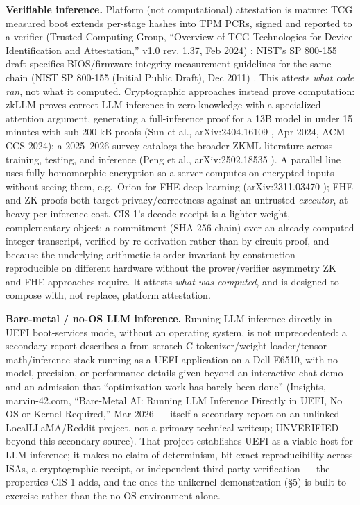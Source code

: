 \documentclass[11pt]{article}
\begin{document}
\textbf{Verifiable inference.} Platform (not computational) attestation is
mature: TCG measured boot extends per-stage hashes into TPM PCRs, signed
and reported to a verifier (Trusted Computing Group, ``Overview of TCG
Technologies for Device Identification and Attestation,'' v1.0 rev. 1.37,
Feb 2024) \citep{tcg2024overview}; NIST's SP 800-155 draft specifies BIOS/firmware integrity
measurement guidelines for the same chain (NIST SP 800-155 (Initial Public
Draft), Dec 2011) \citep{nist2011sp800155}. This attests \emph{what code ran}, not what it computed.
Cryptographic approaches instead prove computation: zkLLM proves correct
LLM inference in zero-knowledge with a specialized attention argument,
generating a full-inference proof for a 13B model in under 15 minutes with
sub-200 kB proofs (Sun et al., arXiv:2404.16109 \citep{sun2024zkllm}, Apr 2024, ACM CCS 2024); a
2025--2026 survey catalogs the broader ZKML literature across training,
testing, and inference (Peng et al., arXiv:2502.18535 \citep{peng2025zkmlsurvey}). A parallel line
uses fully homomorphic encryption so a server computes on encrypted inputs
without seeing them, e.g.~Orion for FHE deep learning (arXiv:2311.03470 \citep{orion2023fhe});
FHE and ZK proofs both target privacy/correctness against an untrusted
\emph{executor}, at heavy per-inference cost. CIS-1's decode receipt is a
lighter-weight, complementary object: a commitment (SHA-256 chain) over an
already-computed integer transcript, verified by re-derivation rather than
by circuit proof, and --- because the underlying arithmetic is
order-invariant by construction --- reproducible on different hardware
without the prover/verifier asymmetry ZK and FHE approaches require. It
attests \emph{what was computed}, and is designed to compose with, not replace,
platform attestation.

\textbf{Bare-metal / no-OS LLM inference.} Running LLM inference directly in UEFI
boot-services mode, without an operating system, is not unprecedented: a
secondary report describes a from-scratch C tokenizer/weight-loader/tensor-
math/inference stack running as a UEFI application on a Dell E6510, with no
model, precision, or performance details given beyond an interactive chat
demo and an admission that ``optimization work has barely been done''
(Insights, marvin-42.com, ``Bare-Metal AI: Running LLM Inference Directly in
UEFI, No OS or Kernel Required,'' Mar 2026 \citep{insights2026baremetal} --- itself a secondary report on an
unlinked LocalLLaMA/Reddit project, not a primary technical writeup;
UNVERIFIED beyond this secondary source). That project establishes UEFI as
a viable host for LLM inference; it makes no claim of determinism,
bit-exact reproducibility across ISAs, a cryptographic receipt, or
independent third-party verification --- the properties CIS-1 adds, and the
ones the unikernel demonstration (§5) is built to exercise rather than the
no-OS environment alone.
\end{document}

